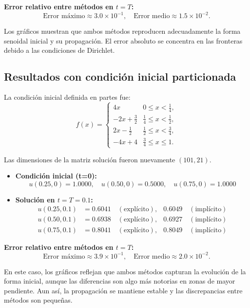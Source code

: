 \documentclass[12pt,a4paper]{article}
\begin{document}
\textbf{Error relativo entre métodos en $t=T$:}
\[
\text{Error máximo} \approx 3.0 \times 10^{-1}, \quad \text{Error medio} \approx 1.5 \times 10^{-2}.
\]

Los gráficos muestran que ambos métodos reproducen adecuadamente la forma senoidal inicial y su propagación.  
El error absoluto se concentra en las fronteras debido a las condiciones de Dirichlet.

\subsection{Resultados con condición inicial particionada}

La condición inicial definida en partes fue:
\[
f(x) =
\begin{cases}
4x & 0 \leq x < \tfrac{1}{4}, \\
-2x + \tfrac{3}{2} & \tfrac{1}{4} \leq x < \tfrac{1}{2}, \\
2x - \tfrac{1}{2} & \tfrac{1}{2} \leq x < \tfrac{3}{4}, \\
-4x + 4 & \tfrac{3}{4} \leq x \leq 1.
\end{cases}
\]

Las dimensiones de la matriz solución fueron nuevamente $(101,21)$.

\begin{itemize}
    \item \textbf{Condición inicial (t=0):}
    \[
    u(0.25,0) = 1.0000, \quad u(0.50,0) = 0.5000, \quad u(0.75,0) = 1.0000
    \]

    \item \textbf{Solución en $t = T = 0.1$:}
    \begin{align*}
    u(0.25,0.1) &= 0.6041 \quad (\text{explícito}), & 0.6049 \quad (\text{implícito}) \\
    u(0.50,0.1) &= 0.6938 \quad (\text{explícito}), & 0.6927 \quad (\text{implícito}) \\
    u(0.75,0.1) &= 0.8041 \quad (\text{explícito}), & 0.8049 \quad (\text{implícito})
    \end{align*}
\end{itemize}

\textbf{Error relativo entre métodos en $t=T$:}
\[
\text{Error máximo} \approx 3.9 \times 10^{-1}, \quad \text{Error medio} \approx 2.0 \times 10^{-2}.
\]

En este caso, los gráficos reflejan que ambos métodos capturan la evolución de la forma inicial, aunque las diferencias son algo más notorias en zonas de mayor pendiente.  
Aun así, la propagación se mantiene estable y las discrepancias entre métodos son pequeñas.
\end{document}
